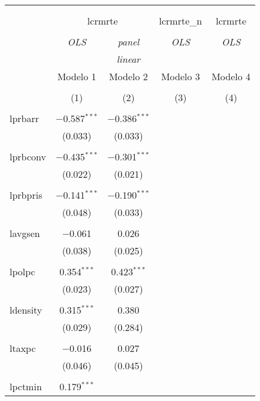
\begin{tabular}{@{\extracolsep{5pt}}lcccc} 
\\[-1.8ex]\hline 
\hline \\[-1.8ex] 
\\[-1.8ex] & \multicolumn{2}{c}{lcrmrte} & lcrmrte\_n & lcrmrte \\ 
\\[-1.8ex] & \textit{OLS} & \textit{panel} & \textit{OLS} & \textit{OLS} \\ 
 & \textit{} & \textit{linear} & \textit{} & \textit{} \\ 
 & Modelo 1 & Modelo 2 & Modelo 3 & Modelo 4 \\ 
\\[-1.8ex] & (1) & (2) & (3) & (4)\\ 
\hline \\[-1.8ex] 
 lprbarr & $-$0.587$^{***}$ & $-$0.386$^{***}$ &  &  \\ 
  & (0.033) & (0.033) &  &  \\ 
  & & & & \\ 
 lprbconv & $-$0.435$^{***}$ & $-$0.301$^{***}$ &  &  \\ 
  & (0.022) & (0.021) &  &  \\ 
  & & & & \\ 
 lprbpris & $-$0.141$^{***}$ & $-$0.190$^{***}$ &  &  \\ 
  & (0.048) & (0.033) &  &  \\ 
  & & & & \\ 
 lavgsen & $-$0.061 & 0.026 &  &  \\ 
  & (0.038) & (0.025) &  &  \\ 
  & & & & \\ 
 lpolpc & 0.354$^{***}$ & 0.423$^{***}$ &  &  \\ 
  & (0.023) & (0.027) &  &  \\ 
  & & & & \\ 
 ldensity & 0.315$^{***}$ & 0.380 &  &  \\ 
  & (0.029) & (0.284) &  &  \\ 
  & & & & \\ 
 ltaxpc & $-$0.016 & 0.027 &  &  \\ 
  & (0.046) & (0.045) &  &  \\ 
  & & & & \\ 
 lpctmin & 0.179$^{***}$ &  &  &  \\ 

\end{tabular}
